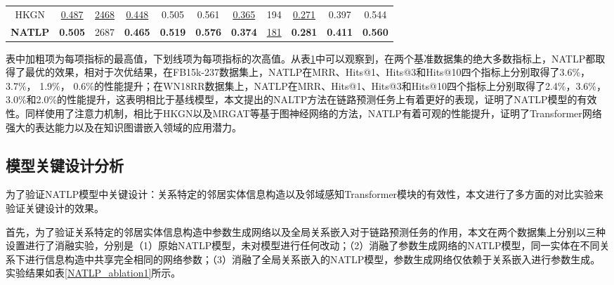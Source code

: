 \begin{table}[htbp]
\begin{center}
\begin{tabular}{*{11}{c}}
          HKGN&\underline{0.487}&\underline{2468}&\underline{0.448}&0.505&0.561&\underline{0.365}&194&\underline{0.271}&0.397&0.544\\
          \cmidrule{1-11}
          \textbf{NATLP}&\textbf{0.505}&2687&\textbf{0.465}&\textbf{0.519}&\textbf{0.576}&\textbf{0.374}&\underline{181}&\textbf{0.281}&\textbf{0.411}&\textbf{0.560}\\
          \bottomrule
      \end{tabular}
      \label{NATLP_result_tab}
  \end{center}
\end{table}

表中加粗项为每项指标的最高值，下划线项为每项指标的次高值。从表\ref{NATLP_result_tab}中可以观察到，在两个基准数据集的绝大多数指标上，NATLP都取得了最优的效果，相对于次优结果，在FB15k-237数据集上，NATLP在MRR、Hits@1、Hits@3和Hits@10四个指标上分别取得了3.6\%，3.7\%， 1.9\%， 0.6\%的性能提升；在WN18RR数据集上，NATLP在MRR、Hits@1、Hits@3和Hits@10四个指标上分别取得了2.4\%，3.6\%， 3.0\%和2.0\%的性能提升，这表明相比于基线模型，本文提出的NALTP方法在链路预测任务上有着更好的表现，证明了NATLP模型的有效性。同样使用了注意力机制，相比于HKGN以及MRGAT等基于图神经网络的方法，NATLP有着可观的性能提升，证明了Transformer网络强大的表达能力以及在知识图谱嵌入领域的应用潜力。

\subsection{模型关键设计分析}

为了验证NATLP模型中关键设计：关系特定的邻居实体信息构造以及邻域感知Transformer模块的有效性，本文进行了多方面的对比实验来验证关键设计的效果。

首先，为了验证关系特定的邻居实体信息构造中参数生成网络以及全局关系嵌入对于链路预测任务的作用，本文在两个数据集上分别以三种设置进行了消融实验，分别是（1）原始NATLP模型，未对模型进行任何改动；（2）消融了参数生成网络的NATLP模型，同一实体在不同关系下进行信息构造中共享完全相同的网络参数；（3）消融了全局关系嵌入的NATLP模型，参数生成网络仅依赖于关系嵌入进行参数生成。实验结果如表\ref{NATLP_ablation1}所示。

